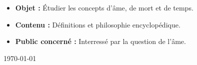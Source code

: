 \begin{titlepage}
\vfill
{\sf \footnotesize
\begin{itemize}[leftmargin=1cm, label=, itemsep=1pt]
\item {\bf Objet : } Étudier les concepts d'âme, de mort et de temps.
\item {\bf Contenu : } Définitions et philosophie encyclopédique.
\item {\bf Public concerné : } Interressé par la question de l'âme.
\end{itemize}
}

\vfill
{\large \today}

\end{titlepage}
